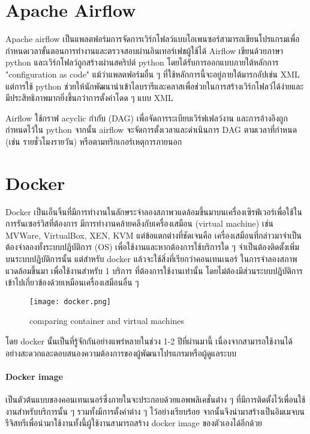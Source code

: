 \section{Apache Airflow}
Apache airflow \cite{airflow} เป็นแพลตฟอร์มการจัดการเวิร์กโฟลว์แบบโอเพนซอร์สามารถเขียนโปรแกรมเพื่อกำหนดเวลาขั้นตอนการทำงานและตรวจสอบผ่านอินเทอร์เฟชผู้ใช้ได้
Airflow เขียนด้วยภาษา python และเวิร์กโฟลว์ถูกสร้างผ่านสคริปต์ python โดยได้รับการออกแบบภายใต้หลักการ "configuration as code" แม้ว่าแพลตฟอร์มอื่น ๆ ที่ใช้หลักการนี้จะอยู่ภายใต้มารกอัปเช่น XML แต่การใช้ python ช่วยให้นักพัฒนานำเข้าไลบรารีและคลาสเพื่อช่วยในการสร้างเวิร์กโฟลว์ได้ง่ายและมีประสิทธิภาพมากยิ่งขึ้นกว่าการตั้งค่าโดด ๆ แบบ XML

Airflow ใช้กราฟ acyclic กำกับ (DAG) เพื่อจัดการระเบียบเวิร์ฟเฟลว์งาน และการอ้างอิงถูกกำหนดไว้ใน python จากนั้น airflow จะจัดการตั้งเวลาและดำเนินการ DAG ตามเวลาที่กำหนด (เช่น รายชั่วโมงรายวัน) หรือตามทริกเกอร์เหตุการภายนอก


\section{Docker}
Docker \cite{docker} เป็นเอ็นจิ้นที่มีการทำงานในลักษระจำลองสภาพวแดล้อมขึ้นมาบนเครื่องเซิรฟ์เวอร์เพื่อใช้ในการรันเซอร์วิสที่ต้องการ มีการทำงานคล้ายคลึงกับเครื่องเสมือน (virtual machine) เช่น MVWare, VirtualBox, XEN, KVM แต่ข้อแตกต่างที่ชัดเจนคือ เครื่องเสมือนที่กล่าวมาจำเป็นต้องจำลองทั้งระบบปฎิบัติการ (OS) เพื่อใช้งานและหากต้องการใช้บริการใด ๆ จำเป็นต้องติดตั้งเพิ่มบนระบบปฎิบัติการนั้น แต่สำหรับ docker แล้วจะใช้สิ่งที่เรียกว่าคอนเทนเนอร์ ในการจำลองสภาพแวดล้อมขึ้นมา เพื่อใช้งานสำหรับ 1 บริการ ที่ต้องการใช้งานเท่านั้น โดยไม่ต้องมีส่วนระบบปฎิบัติการเข้าไปเกี่ยวข้องด้วยเหมือนเครื่องเสมือนอื่น ๆ
\newline
\begin{figure}[!h]
  \centering
  \texttt{[image: docker.png]}  
  \caption{comparing container and virtual machines}
  \label{Fig:cell-and-block}
\end{figure}
โดย docker นั้นเป็นที่รู้จักกันอย่างแพร่หลายในช่วง 1-2 ปีที่ผ่านมานี้ เนื่องจากสามารถใช้งานได้อย่างสะดวกและตอบสนองความต้องการของผู้พัฒนาโปรแกรมหรือผู้ดูแลระบบ
\paragraph*{Docker image}
เป็นตัวต้นแบบของคอนเทนเนอร์ซึ่งภายในจะประกอบด้วยแอพพลิเคชั่นต่าง ๆ ที่มีการติดตั้งไว้เพื่อนใช้งานสำหรับบริการนั้น ๆ รวมทั้งมีการตั้งค่าต่าง ๆ ไว้อย่างเรียบร้อย จากนั้นจึงนำมาสร้างเป็นอิมเมจบนรีจิสทรีเพื่อนำมาใช้งานทั้งนี้ผู้ใช้งานสามารถสร้าง docker image ของตัวเองได้อีกด้วย
